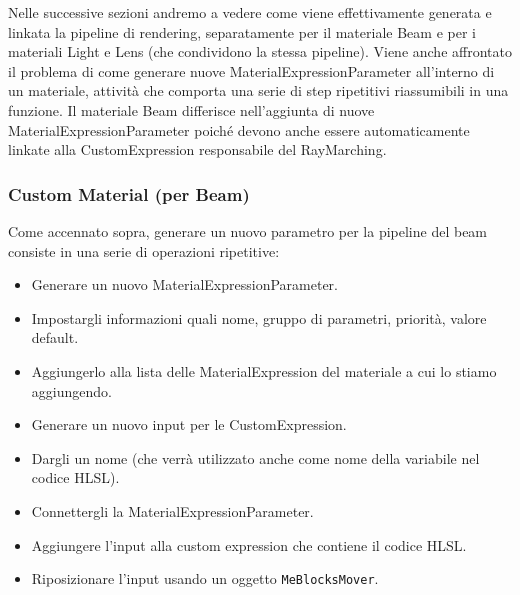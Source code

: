 \documentclass[main.tex]{subfiles}
\begin{document}
Nelle successive sezioni andremo a vedere come viene effettivamente generata e linkata la pipeline di rendering, separatamente per il materiale Beam e per i materiali Light e Lens (che condividono la stessa pipeline). Viene anche affrontato il problema di come generare nuove MaterialExpressionParameter all'interno di un materiale, attività che comporta una serie di step ripetitivi riassumibili in una funzione. Il materiale Beam differisce nell'aggiunta di nuove MaterialExpressionParameter poiché devono anche essere automaticamente linkate alla CustomExpression responsabile del RayMarching.

\subsubsection{Custom Material (per Beam)}\label{subsec:2_3_CM}
Come accennato sopra, generare un nuovo parametro per la pipeline del beam consiste in una serie di operazioni ripetitive:
\begin{itemize}
    \item Generare un nuovo MaterialExpressionParameter.
    \item Impostargli informazioni quali nome, gruppo di parametri, priorità, valore default.
    \item Aggiungerlo alla lista delle MaterialExpression del materiale a cui lo stiamo aggiungendo.
    \item Generare un nuovo input per le CustomExpression.
    \item Dargli un nome (che verrà utilizzato anche come nome della variabile nel codice HLSL).
    \item Connettergli la MaterialExpressionParameter.
    \item Aggiungere l'input alla custom expression che contiene il codice HLSL.
    \item Riposizionare l'input usando un oggetto \lstinline{MeBlocksMover}.
\end{itemize}
\end{document}

